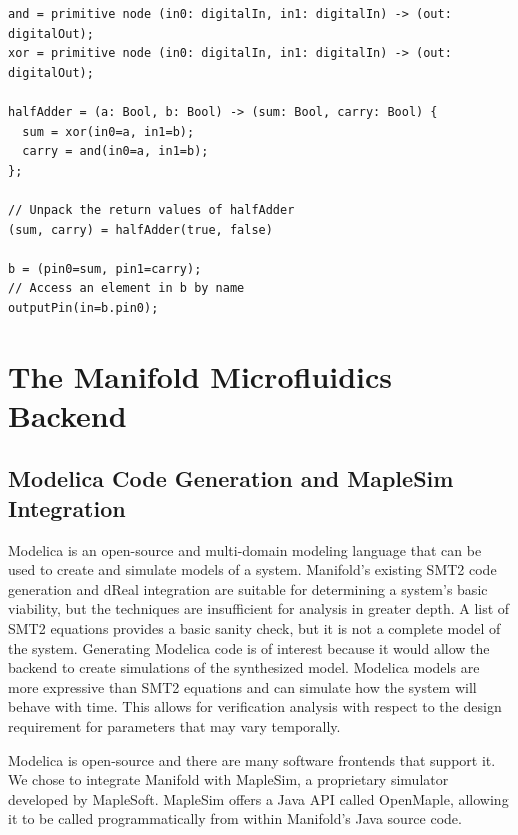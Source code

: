 \begin{lstlisting}[label=lst:unpacking, caption=Examples of new tuple features]
and = primitive node (in0: digitalIn, in1: digitalIn) -> (out: digitalOut);
xor = primitive node (in0: digitalIn, in1: digitalIn) -> (out: digitalOut);

halfAdder = (a: Bool, b: Bool) -> (sum: Bool, carry: Bool) {
  sum = xor(in0=a, in1=b);
  carry = and(in0=a, in1=b);
};

// Unpack the return values of halfAdder
(sum, carry) = halfAdder(true, false)

b = (pin0=sum, pin1=carry);
// Access an element in b by name
outputPin(in=b.pin0);
\end{lstlisting}

\section{The Manifold Microfluidics Backend}

\subsection{Modelica Code Generation and MapleSim Integration}

Modelica is an open-source and multi-domain modeling language that can be used
to create and simulate models of a system. \cite{Maplesim}\cite{modelica}
Manifold's existing SMT2 code generation and dReal integration are suitable for
determining a system's basic viability, but the techniques are insufficient for
analysis in greater depth.
A list of SMT2 equations provides a basic sanity check, but it is not a complete model of the system.
Generating Modelica code is of interest because it would allow the backend to create simulations of the synthesized model.
Modelica models are more expressive than SMT2 equations and can simulate how the system will behave with time. 
This allows for verification analysis
with respect to the design requirement for parameters that may vary temporally. %

Modelica is open-source and there are many software frontends that support it.
We chose to integrate Manifold with MapleSim, a proprietary simulator developed by MapleSoft.
MapleSim offers a Java API called OpenMaple, allowing it to be called programmatically from within Manifold's Java source code.

